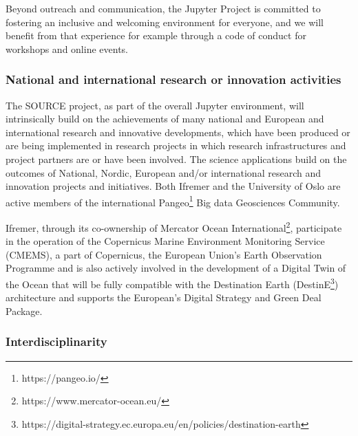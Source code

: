 Beyond outreach and communication, the Jupyter Project is committed to fostering an
inclusive and welcoming environment for everyone, and we will benefit from that
experience for example through a code of conduct for workshops and online events.

\subsubsection{National and international research or innovation activities}


The SOURCE project, as part of the overall Jupyter environment, will intrinsically build on the achievements of many
 national and European and international research and innovative developments, which have been produced or are
 being implemented in research projects in which research infrastructures and project partners are or have been
 involved.
The science applications build on the outcomes of National, Nordic, European and/or international research and
innovation projects and initiatives. Both Ifremer and the University of Oslo are active members of the international
Pangeo\footnote{https://pangeo.io/} Big data Geosciences Community.

Ifremer, through its co-ownership of Mercator Ocean International\footnote{https://www.mercator-ocean.eu/},
 participate in the operation of the Copernicus Marine Environment Monitoring Service (CMEMS),
 a part of Copernicus, the European Union’s Earth Observation Programme and is also actively involved in the
 development of a Digital Twin of the Ocean that will be fully compatible with the Destination Earth (DestinE\footnote{https://digital-strategy.ec.europa.eu/en/policies/destination-earth})
 architecture and supports the European's Digital Strategy and Green Deal Package.

\subsubsection{Interdisciplinarity}

